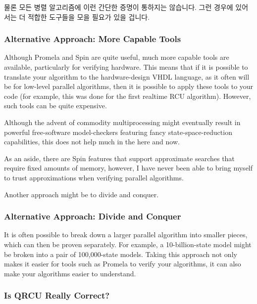 물론 모든 병렬 알고리즘에 이런 간단한 증명이 통하지는 않습니다.
그런 경우에 있어서는 더 적합한 도구들을 모을 필요가 있을 겁니다.
\iffalse

Of course, not all parallel algorithms have such simple proofs.
In such cases, it may be necessary to enlist more capable tools.
\fi

\subsubsection{Alternative Approach: More Capable Tools}
\label{sec:formal:Alternative Approach: More Capable Tools}

Although Promela and Spin are quite useful,
much more capable tools are available, particularly for verifying
hardware.
This means that if it is possible to translate your algorithm
to the hardware-design VHDL language, as it often will be for
low-level parallel algorithms, then it is possible to apply these
tools to your code (for example, this was done for the first
realtime RCU algorithm).
However, such tools can be quite expensive.

Although the advent of commodity multiprocessing
might eventually result in powerful free-software model-checkers
featuring fancy state-space-reduction capabilities,
this does not help much in the here and now.

As an aside, there are Spin features that support approximate searches
that require fixed amounts of memory, however, I have never been able
to bring myself to trust approximations when verifying parallel
algorithms.

Another approach might be to divide and conquer.

\subsubsection{Alternative Approach: Divide and Conquer}
\label{sec:formal:Alternative Approach: Divide and Conquer}

It is often possible to break down a larger parallel algorithm into
smaller pieces, which can then be proven separately.
For example, a 10-billion-state model might be broken into a pair
of 100,000-state models.
Taking this approach not only makes it easier for tools such as
Promela to verify your algorithms, it can also make your algorithms
easier to understand.

\subsubsection{Is QRCU Really Correct?}
\label{sec:formal:Is QRCU Really Correct?}

